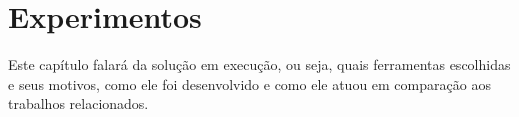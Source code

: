 \chapter{Experimentos}\label{chp:EXPERIMENTOS}

Este capítulo falará da solução em execução, ou seja, quais ferramentas escolhidas e seus motivos, como ele foi desenvolvido e como ele atuou em comparação aos trabalhos relacionados.